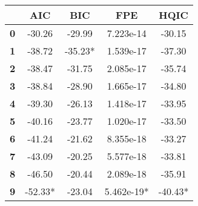 \documentclass{report}
\begin{document}
\begin{center}
\begin{tabular}{lcccc}
\toprule
           & \textbf{AIC} & \textbf{BIC} & \textbf{FPE} & \textbf{HQIC}  \\
\midrule
\textbf{0} &      -30.26  &      -29.99  &   7.223e-14  &       -30.15   \\
\textbf{1} &      -38.72  &     -35.23*  &   1.539e-17  &       -37.30   \\
\textbf{2} &      -38.47  &      -31.75  &   2.085e-17  &       -35.74   \\
\textbf{3} &      -38.84  &      -28.90  &   1.665e-17  &       -34.80   \\
\textbf{4} &      -39.30  &      -26.13  &   1.418e-17  &       -33.95   \\
\textbf{5} &      -40.16  &      -23.77  &   1.020e-17  &       -33.50   \\
\textbf{6} &      -41.24  &      -21.62  &   8.355e-18  &       -33.27   \\
\textbf{7} &      -43.09  &      -20.25  &   5.577e-18  &       -33.81   \\
\textbf{8} &      -46.50  &      -20.44  &   2.089e-18  &       -35.91   \\
\textbf{9} &     -52.33*  &      -23.04  &  5.462e-19*  &      -40.43*   \\
\bottomrule
\end{tabular}
\end{center}
\end{document}
